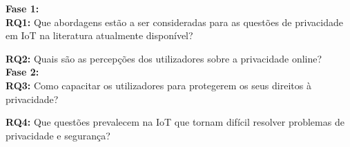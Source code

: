 \documentclass[conference]{IEEEtran}
\begin{document}

\vspace{5mm}
\textbf{Fase 1:} \\


\textbf{RQ1:} Que abordagens estão a ser consideradas para as questões de
privacidade em IoT na literatura atualmente disponível?


\textbf{RQ2:} Quais são as percepções dos utilizadores sobre a privacidade
online? \\


\textbf{Fase 2:} \\


\textbf{RQ3:} Como capacitar os utilizadores para protegerem os seus direitos
à privacidade?


\textbf{RQ4:} Que questões prevalecem na IoT que tornam difícil resolver
problemas de privacidade e segurança?
\end{document}
